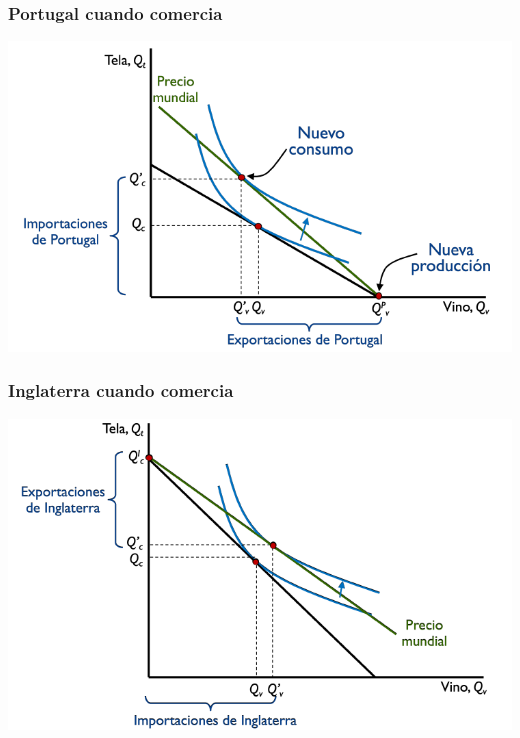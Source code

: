 \documentclass{beamer}
\begin{document}

\begin{frame}
\frametitle{Portugal cuando comercia}
\centering
\includegraphics[scale=0.6]{Slides Principios de Economia/Figures/Tema_03_5_portugal3.png}
\end{frame}

\begin{frame}
\frametitle{Inglaterra cuando comercia}
\centering
\includegraphics[scale=0.6]{Slides Principios de Economia/Figures/Tema_03_6_inglaterra3.png}
\end{frame}
\end{document}
